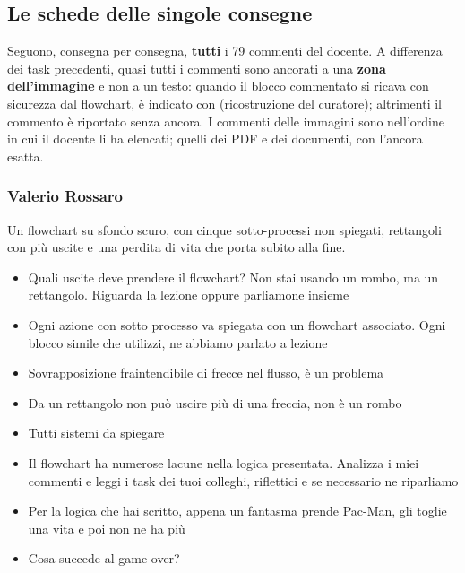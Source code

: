 \subsection{Le schede delle singole consegne}
\label{rv:t4:sec:schede}

Seguono, consegna per consegna, \textbf{tutti} i 79 commenti del docente. A
differenza dei task precedenti, quasi tutti i commenti sono ancorati a una
\textbf{zona dell'immagine} e non a un testo: quando il blocco commentato si
ricava con sicurezza dal flowchart, è indicato con 
(ricostruzione del curatore); altrimenti il commento è riportato senza
ancora. I commenti delle immagini sono nell'ordine in cui il docente li ha
elencati; quelli dei PDF e dei documenti, con l'ancora esatta.

\subsubsection{Valerio Rossaro}
Un flowchart su sfondo scuro, con cinque sotto-processi non spiegati,
rettangoli con più uscite e una perdita di vita che porta subito alla fine.
{\small
\begin{itemize}
  \item Quali uscite deve prendere il flowchart? Non stai usando un rombo, ma un rettangolo. Riguarda la lezione oppure parliamone insieme
  \item Ogni azione con sotto processo va spiegata con un flowchart associato. Ogni blocco simile che utilizzi, ne abbiamo parlato a lezione
  \item Sovrapposizione fraintendibile di frecce nel flusso, è un problema
  \item Da un rettangolo non può uscire più di una freccia, non è un rombo
  \item Tutti sistemi da spiegare
  \item Il flowchart ha numerose lacune nella logica presentata. Analizza i miei commenti e leggi i task dei tuoi colleghi, riflettici e se necessario ne riparliamo
  \item {} Per la logica che hai scritto, appena un fantasma prende Pac-Man, gli toglie una vita e poi non ne ha più
  \item {} Cosa succede al game over?
\end{itemize}
}

